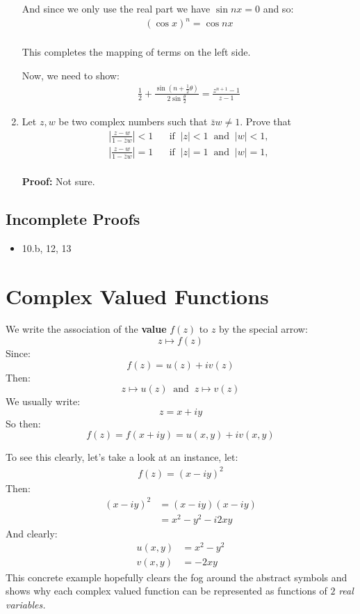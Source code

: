 \begin{enumerate}
	And since we only use the real part we have $\sin nx = 0$ and so:
	\begin{align*}
		\left( \cos x \right)^n = \cos nx \\
	\end{align*}

	This completes the mapping of terms on the left side.

	Now, we need to show:
	\begin{align*}
		\frac{1}{2} + \frac{\sin (n + \frac{1}{2}\theta)}{2 \sin \frac{\theta}{2}} = \frac{z^{n + 1} - 1}{z - 1}
	\end{align*}

	\item Let $z, w$ be two complex numbers such that $\bar{z}w \neq 1.$ Prove that
	\begin{align*}
		\left| \frac{z - w}{1 - \bar{z}w} \right| < 1 \;\;\;\;\;\; \text{if} \;\; |z| < 1 \;\; \text{and} \;\; |w| < 1, \\
		\left| \frac{z - w}{1 - \bar{z}w} \right| = 1 \;\;\;\;\;\; \text{if} \;\; |z| = 1 \;\; \text{and} \;\; |w| = 1, \\
	\end{align*}
	
	\textbf{Proof:}
	Not sure.

\end{enumerate}

\subsection{Incomplete Proofs}
\begin{itemize}
	\item 10.b, 12, 13
\end{itemize}

\section{Complex Valued Functions}
We write the association of the \textbf{value} $f(z)$ to $z$ by the special arrow:
\[z \mapsto f(z) \]
Since:
\[f(z) = u(z) +iv(z)\]
Then:
\[z \mapsto u(z) \;\; \text{and} \;\;  z \mapsto v(z) \]
We usually write:
\[z = x + iy\]
So then:
\[f(z) = f(x + iy) = u(x,y) + iv(x,y)\]

To see this clearly, let's take a look at an instance, let:
\begin{align*}
	f(z) = (x - iy)^2
\end{align*}
Then:
\begin{align*}
	(x - iy)^2 &= (x - iy)(x - iy) \\
	&= x^2 - y^2 - i2xy
\end{align*}
And clearly:
\begin{align*}
	u(x, y) &= x^2 - y^2 \\
	v(x, y) &= -2xy
\end{align*}
This concrete example hopefully clears the fog around the abstract symbols and 
shows why each complex valued function can be represented as functions of $2$ \textit{real variables.} 


